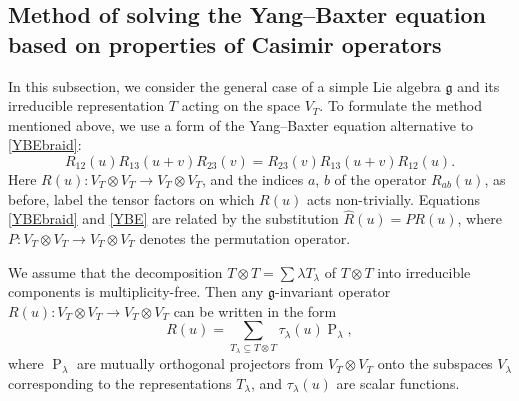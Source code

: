 \documentclass[a4paper]{article}
\newcommand{\hR}{\hat{R}}
\renewcommand{\=}{\ =\ }
\DeclareMathOperator{\proj}{P}
\numberwithin{equation}{section}
\theoremstyle{remark}
\begin{document}
\subsection{Method of solving the Yang--Baxter equation based on properties of Casimir operators}

In this subsection, we consider the general case of a simple Lie algebra $\mathfrak{g}$ and its irreducible representation $T$ acting on the space $V_T$. To formulate the method mentioned above, we use a form of the Yang--Baxter equation alternative to \eqref{YBEbraid}:
\begin{equation}\label{YBE}
R_{12}(u)R_{13}(u+v)R_{23}(v)=R_{23}(v)R_{13}(u+v)R_{12}(u).
\end{equation}
Here $R(u):V_T\otimes V_T\to V_T\otimes V_T$, and the indices $a$, $b$ of the operator $R_{ab}(u)$, as before, label the tensor factors on which $R(u)$ acts non-trivially. Equations \eqref{YBEbraid} and \eqref{YBE} are related by the substitution $\hR(u)=PR(u)$, where $P:V_T\otimes V_T\to V_T\otimes V_T$ denotes the permutation operator.

We assume that the decomposition $T\otimes T=\sum{\lambda} T_\lambda$ of $T\otimes T$ into irreducible components is multiplicity-free. Then any $\mathfrak{g}$-invariant operator $R(u):V_T\otimes V_T\to V_T\otimes V_T$ can be written in the form
\begin{equation}\label{R-general expansion}
R(u)=\sum_{T_\lambda\subseteq T\otimes T}\tau_\lambda(u)\proj_\lambda,
\end{equation}
where $\proj_\lambda$ are mutually orthogonal projectors from $V_T\otimes V_T$ onto the subspaces $V_\lambda$ corresponding to the representations $T_\lambda$, and $\tau_\lambda(u)$ are scalar functions.
\end{document}
